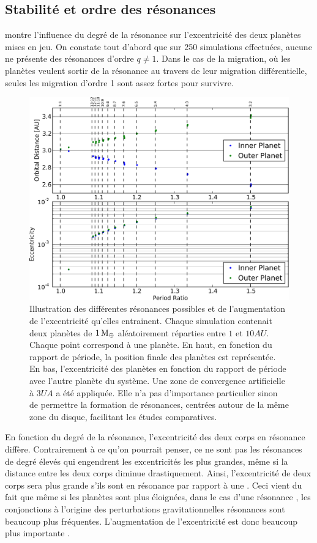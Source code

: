 \subsection{Stabilité et ordre des résonances}
 montre l'influence du degré de la résonance sur l'excentricité des deux planètes mises en jeu. On
constate tout d'abord que sur 250 simulations effectuées, aucune ne présente des résonances d'ordre $q\neq 1$. Dans le cas de la
migration, où les planètes veulent sortir de la résonance au travers de leur migration différentielle, seules les migration
d'ordre 1 sont assez fortes pour survivre. 


\begin{figure}[htb]
\centering
\includegraphics[width=0.75\linewidth]{figure/MMR_statistique.pdf}
\caption{Illustration des différentes résonances possibles et de l'augmentation de l'excentricité qu'elles entrainent. Chaque
simulation contenait deux planètes de $1\mathrm{\thinspace M_\oplus}$ aléatoirement réparties entre $1$ et $10\unit{AU}$. Chaque point correspond à
une planète. En haut, en fonction du rapport de période, la position finale des planètes est
représentée. En bas, l'excentricité des planètes en fonction du rapport de période avec l'autre planète du système. Une zone de
convergence artificielle à $3\unit{UA}$ a été appliquée. Elle n'a pas d'importance particulier sinon de permettre la formation
de résonances, centrées autour de la même zone du disque, facilitant les études comparatives.}\label{fig:MMR_statistique}
\end{figure}

En fonction du degré de la résonance, l'excentricité des deux corps en résonance diffère. Contrairement à ce qu'on pourrait
penser, ce ne sont pas les résonances de degré élevés qui engendrent les excentricités les plus grandes, même si la distance
entre les deux corps diminue drastiquement. Ainsi, l'excentricité de deux corps sera plus grande s'ils sont en résonance
 par rapport à une . Ceci vient du fait que même si les planètes sont plus éloignées, dans le cas d'une
résonance , les conjonctions à l'origine des perturbations gravitationnelles résonances sont beaucoup plus
fréquentes. L'augmentation de l'excentricité est donc beaucoup plus importante \citep{murray2000solar}. 

